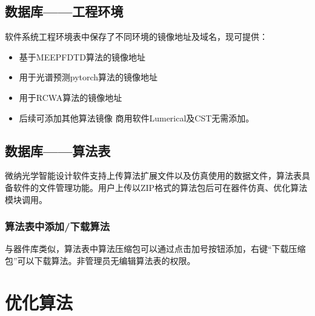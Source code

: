 \documentclass[a4paper,10pt,english]{sphinxmanual}
\begin{document}
{{\subsection{数据库——工程环境}
\label{\detokenize{_u8f6f_u4ef6_u6a21_u5757_u4ecb_u7ecd/_u6570_u636e_u5e93/contents:id5}}
\sphinxAtStartPar
软件系统工程环境表中保存了不同环境的镜像地址及域名，现可提供：
\begin{itemize}
\item {} 
\sphinxAtStartPar
基于MEEP\sphinxhyphen{}FDTD算法的镜像地址

\item {} 
\sphinxAtStartPar
用于光谱预测pytorch算法的镜像地址

\item {} 
\sphinxAtStartPar
用于RCWA算法的镜像地址

\item {} 
\sphinxAtStartPar
后续可添加其他算法镜像
商用软件Lumerical及CST无需添加。

\end{itemize}


\subsection{数据库——算法表}
\label{\detokenize{_u8f6f_u4ef6_u6a21_u5757_u4ecb_u7ecd/_u6570_u636e_u5e93/contents:id6}}
\sphinxAtStartPar
微纳光学智能设计软件支持上传算法扩展文件以及仿真使用的数据文件，算法表具备软件的文件管理功能。用户上传以ZIP格式的算法包后可在器件仿真、优化算法模块调用。


\sphinxAtStartPar
{}





\sphinxAtStartPar
{}






\subsubsection{算法表中添加/下载算法}
\label{\detokenize{_u8f6f_u4ef6_u6a21_u5757_u4ecb_u7ecd/_u6570_u636e_u5e93/contents:id7}}
\sphinxAtStartPar
与器件库类似，算法表中算法压缩包可以通过点击加号按钮添加，右键“下载压缩包”可以下载算法。非管理员无编辑算法表的权限。

\sphinxstepscope


\section{优化算法}
\label{\detokenize{_u8f6f_u4ef6_u6a21_u5757_u4ecb_u7ecd/_u4f18_u5316_u7b97_u6cd5/contents:id1}}\label{\detokenize{_u8f6f_u4ef6_u6a21_u5757_u4ecb_u7ecd/_u4f18_u5316_u7b97_u6cd5/contents::doc}}

}}
\end{document}
